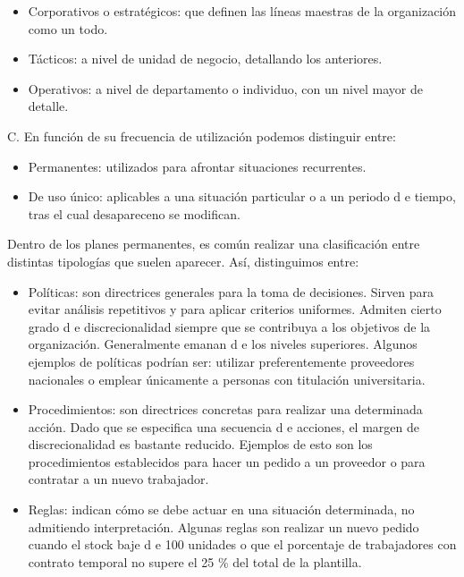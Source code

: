 \documentclass[
]{krantz}
\providecommand{\tightlist}{%
  \setlength{\itemsep}{0pt}\setlength{\parskip}{0pt}}
\begin{document}
\begin{itemize}
\tightlist
\item
  Corporativos o estratégicos: que definen las líneas maestras de la organización como un todo.
\item
  Tácticos: a nivel de unidad de negocio, detallando los anteriores.
\item
  Operativos: a nivel de departamento o individuo, con un nivel mayor de detalle.
\end{itemize}

C. En función de su frecuencia de utilización podemos distinguir entre:

\begin{itemize}
\tightlist
\item
  Permanentes: utilizados para afrontar situaciones recurrentes.
\item
  De uso único: aplicables a una situación particular o a un periodo d e tiempo, tras el cual desapareceno se modifican.
\end{itemize}

Dentro de los planes permanentes, es común realizar una clasificación entre distintas tipologías que suelen aparecer. Así, distinguimos entre:

\begin{itemize}
\tightlist
\item
  Políticas: son directrices generales para la toma de decisiones. Sirven para evitar análisis repetitivos y para aplicar criterios uniformes. Admiten cierto grado d e discrecionalidad siempre que se contribuya a los objetivos de la organización. Generalmente emanan d e los niveles superiores. Algunos ejemplos de políticas podrían ser: utilizar preferentemente proveedores nacionales o emplear únicamente a personas con titulación universitaria.
\item
  Procedimientos: son directrices concretas para realizar una determinada acción. Dado que se especifica una secuencia d e acciones, el margen de discrecionalidad es bastante reducido. Ejemplos de esto son los procedimientos establecidos para hacer un pedido a un proveedor o para contratar a un nuevo trabajador.
\item
  Reglas: indican cómo se debe actuar en una situación determinada, no admitiendo interpretación. Algunas reglas son realizar un nuevo pedido cuando el stock baje d e 100 unidades o que el porcentaje de trabajadores con contrato temporal no supere el 25 \% del total de la plantilla.
\end{itemize}
\end{document}
